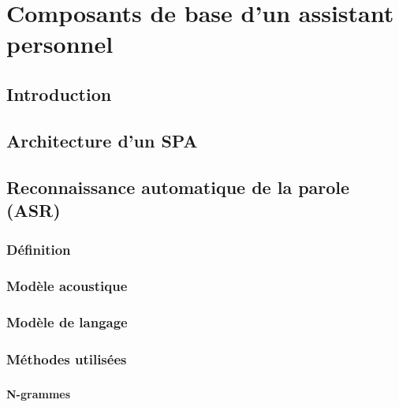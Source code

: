 \chapter{Composants de base d'un assistant personnel}

\section{Introduction}
\section{Architecture d'un SPA}
\section{Reconnaissance automatique de la parole (ASR)}
	\paragraph{}
	\subsection{Définition}
		\paragraph{}
	\subsection{Modèle acoustique}
		\paragraph{}
	\subsection{Modèle de langage}
		\paragraph{}
	\subsection{Méthodes utilisées}
		\paragraph{}
		\subsubsection{N-grammes}
